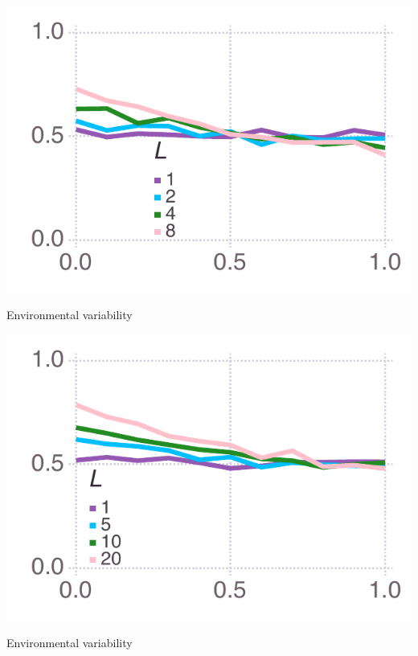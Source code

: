 \documentclass[varwidth=true,crop=false]{standalone}
\begin{document}
		\begin{minipage}{3.75in}%
		  \includegraphics[width=\textwidth]{mean_social_learner_over_u_lowpayoff=0.8_nbehaviors=4.pdf}
		  \\[-2.75em]
	  \begin{center}
          {\hspace{3.25em} \huge Environmental variability}
      \end{center}
    \end{minipage}
	\begin{minipage}{3.75in}%
		  \includegraphics[width=\textwidth]{mean_social_learner_over_u_lowpayoff=0.8_nbehaviors=10.pdf}
		  \\[-2.75em]
	  \begin{center}
          {\hspace{3.25em} \huge Environmental variability}
      \end{center}
	\end{minipage}
\end{document}
